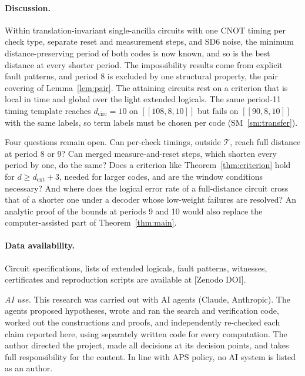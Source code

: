 \documentclass[aps,prl,twocolumn,superscriptaddress,nofootinbib]{revtex4-2}
\newcommand{\dcirc}{d_{\mathrm{circ}}}
\newcommand{\dext}{d_{\mathrm{ext}}}
\newcommand{\code}[1]{[[#1]]}
\newcommand{\T}{\mathcal{T}}
\begin{document}
\paragraph{Discussion.}
Within translation-invariant single-ancilla circuits with one CNOT timing per check type,
separate reset and measurement steps, and SD6 noise, the minimum distance-preserving
period of both codes is now known, and so is the best distance at every shorter period.
The impossibility results come from explicit fault patterns, and period 8 is excluded by one
structural property, the pair covering of Lemma~\ref{lem:pair}. The attaining circuits rest on
a criterion that is local in time and global over the light extended logicals. The same
period-11 timing template reaches $\dcirc=10$ on $\code{108,8,10}$ but fails on
$\code{90,8,10}$ with the same labels, so term labels must be chosen per code
(SM~\ref{sm:transfer}).

Four questions remain open. Can per-check timings, outside $\T$, reach full distance at
period 8 or 9? Can merged measure-and-reset steps, which shorten every period by one, do the
same? Does a criterion like Theorem~\ref{thm:criterion} hold for $d\ge\dext+3$, needed for
larger codes, and are the window conditions necessary? And where does the logical error
rate of a full-distance circuit cross that of a shorter one under a decoder whose low-weight
failures are resolved? An analytic proof of the bounds at periods 9 and 10 would also
replace the computer-assisted part of Theorem~\ref{thm:main}.

\paragraph{Data availability.}
Circuit specifications, lists of extended logicals, fault patterns, witnesses,
certificates and reproduction scripts are available at [Zenodo DOI].

\begin{acknowledgments}
\emph{AI use.} This research was carried out with AI agents (Claude, Anthropic).
The agents proposed hypotheses, wrote and ran the search and verification code,
worked out the constructions and proofs, and independently re-checked each claim
reported here, using separately written code for every computation. The author directed the project, made all decisions
at its decision points, and takes full responsibility for the content. In line
with APS policy, no AI system is listed as an author.
\end{acknowledgments}
\end{document}
